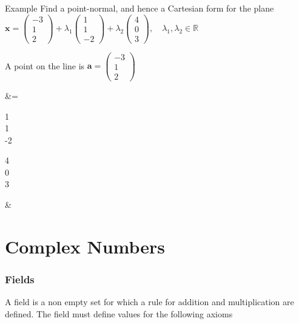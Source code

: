 \documentclass{report}
\renewcommand{\vec}{\mathbf}
\newcommand{\cvec}[1]{ \begin{pmatrix} #1 \end{pmatrix} }
\begin{document}
			\begin{question}{Example}
				Find a point-normal, and hence a Cartesian form for the plane $\vec{x} = \cvec{-3\\1\\2} + \lambda_1 \cvec{1\\1\\-2} + \lambda_2 \cvec{4\\0\\3}, \quad \lambda_1, \lambda_2 \in \mathbb{R}$

				A point on the line is $\vec{a} = \cvec{-3\\1\\2}$
				\begin{flalign*}
					\vec{n} &= \cvec{1\\1\\-2} \times \cvec{4\\0\\3}		& \\
				\end{flalign*}

			\end{question}

\chapter{Complex Numbers}
	
	\subsection{Fields}
		
		A field is a non empty set for which a rule for addition and multiplication are defined. The field must define values for the following axioms
\end{document}
